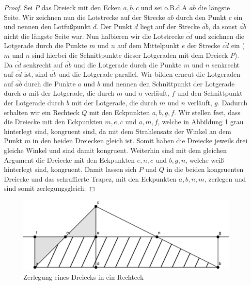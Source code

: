 \documentclass[11pt,titlepage]{article}
\theoremstyle{definition}
\theoremstyle{remark}
\begin{document}
	\begin{proof}
		Sei $P$ das Dreieck mit den Ecken $a,b,c$ und sei o.B.d.A $\overline{ab}$ die längste Seite. Wir zeichnen 
		nun die Lotstrecke auf der Strecke $\overline{ab}$ durch den Punkt $c$ ein und nennen den Lotfußpunkt $d$. 
		Der Punkt $d$ liegt auf der Strecke $\overline{ab}$, da sonst $\overline{ab}$ nicht die längste Seite war. 
		Nun halbieren wir die Lotstrecke $\overline{cd}$ und zeichnen die Lotgerade durch die Punkte $m$ und $n$ 
		auf dem Mittelpunkt $e$ der Strecke $\overline{cd}$ ein ($m$ und $n$ sind hierbei die Schnittpunkte 
		dieser Lotgeraden mit dem Dreieck $P$). Da $\overline{cd}$ senkrecht auf $\overline{ab}$ und die Lotgerade 
		durch die Punkte $m$ und $n$ 
		senkrecht auf $\overline{cd}$ ist, sind $\overline{ab}$ und die Lotgerade parallel. Wir bilden erneut die 
		Lotgeraden auf $\overline{ab}$ durch die Punkte $a$ und $b$ und nennen den Schnittpunkt der Lotgerade 
		durch $a$ mit der Lotgerade, die durch $m$ und $n$ verläuft, $f$ und den Schnittpunkt der Lotgerade durch 
		$b$ mit der Lotgerade, die durch $m$ und $n$ verläuft, $g$. Dadurch erhalten wir ein Rechteck $Q$ mit den 
		Eckpunkten $a,b,g,f$. Wir stellen fest, dass die Dreiecke mit den Eckpunkten $m,e,c$ und $a,m,f$, welche in 
		Abbildung \ref{Abb.1} grau hinterlegt sind, kongruent sind, da mit dem Strahlensatz der Winkel an dem 
		Punkt $m$ in den beiden Dreiecken gleich ist. Somit haben die 
		Dreiecke jeweils drei gleiche Winkel und sind damit kongruent. 
		Weiterhin sind mit dem gleichen Argument die Dreiecke mit den Eckpunkten $e,n,c$ und $b,g,n$, welche weiß 
		hinterlegt sind, kongruent. Damit lassen sich $P$ und $Q$ in die beiden 
		kongruenten Dreiecke und das schraffierte Trapez, mit den Eckpunkten $a,b,n,m$, zerlegen und sind somit 
		zerlegungsgleich.
	\end{proof}
	
	\begin{figure}[!htbp]
		\centering
		\includegraphics[scale=1.6]{DreieckLemma}
		\caption{Zerlegung eines Dreiecks in ein Rechteck}
		\label{Abb.1}
	\end{figure}
	
\end{document}
